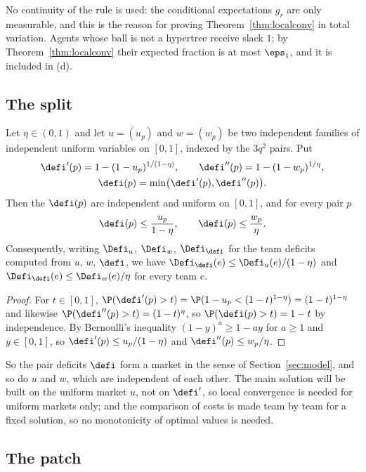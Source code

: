 No continuity of the rule is used: the conditional expectations $g_r$ are only measurable,
and this is the reason for proving Theorem~\ref{thm:localconv} in total variation. Agents
whose ball is not a hypertree receive slack $1$; by Theorem~\ref{thm:localconv} their
expected fraction is at most $\eps_1$, and it is included in (d).

\subsection{The split}\label{sec:lp-split}

\begin{lemma}\label{lem:lp-split}
Let $\eta\in(0,1)$ and let $u=(u_p)$ and $w=(w_p)$ be two independent families of
independent uniform variables on $[0,1]$, indexed by the $3q^2$ pairs. Put
\begin{gather*}
\defi'(p)=1-(1-u_p)^{1/(1-\eta)},\qquad\defi''(p)=1-(1-w_p)^{1/\eta},\\
\defi(p)=\min\bigl(\defi'(p),\defi''(p)\bigr).
\end{gather*}
Then the $\defi(p)$ are independent and uniform on $[0,1]$, and for every pair $p$
\[
\defi(p)\le\frac{u_p}{1-\eta},\qquad\defi(p)\le\frac{w_p}{\eta}.
\]
Consequently, writing $\Defi_u$, $\Defi_w$, $\Defi_{\defi}$ for the team deficits computed
from $u$, $w$, $\defi$, we have $\Defi_{\defi}(e)\le\Defi_u(e)/(1-\eta)$ and
$\Defi_{\defi}(e)\le\Defi_w(e)/\eta$ for every team $e$.
\end{lemma}

\begin{proof}
For $t\in[0,1]$, $\P(\defi'(p)>t)=\P(1-u_p<(1-t)^{1-\eta})=(1-t)^{1-\eta}$ and likewise
$\P(\defi''(p)>t)=(1-t)^{\eta}$, so $\P(\defi(p)>t)=1-t$ by independence. By Bernoulli's
inequality $(1-y)^a\ge1-ay$ for $a\ge1$ and $y\in[0,1]$, so $\defi'(p)\le u_p/(1-\eta)$ and
$\defi''(p)\le w_p/\eta$.
\end{proof}

So the pair deficits $\defi$ form a market in the sense of Section~\ref{sec:model}, and so
do $u$ and $w$, which are independent of each other. The main solution will be built on the
uniform market $u$, not on $\defi'$, so local convergence is needed for uniform markets
only; and the comparison of costs is made team by team for a fixed solution, so no
monotonicity of optimal values is needed.

\subsection{The patch}\label{sec:lp-patch}

